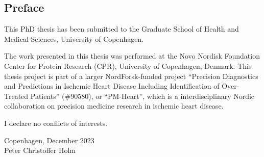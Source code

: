 \begin{@empty}
\thispagestyle{empty}
\setlength{\parindent}{0pt}
\setlength{\parskip}{\baselineskip}

\chapter*{Preface}

This PhD thesis has been submitted
to the Graduate School of Health and Medical Sciences,
University of Copenhagen.

The work presented in this thesis was performed
at the Novo Nordisk Foundation Center for Protein Research (CPR),
University of Copenhagen, Denmark.
This thesis project is part of a larger NordForsk-funded project 
\enquote{Precision Diagnostics and Predictions in Ischemic Heart Disease
Including Identification of Over-Treated Patients} (\#90580), 
or \enquote{PM-Heart}, which is a interdisciplinary Nordic collaboration
on precision medicine research in ischemic heart disease.

I declare no conflicts of interests.

\begin{flushright}
    Copenhagen, December 2023 \\
    Peter Christoffer Holm
\end{flushright}
\end{@empty}

